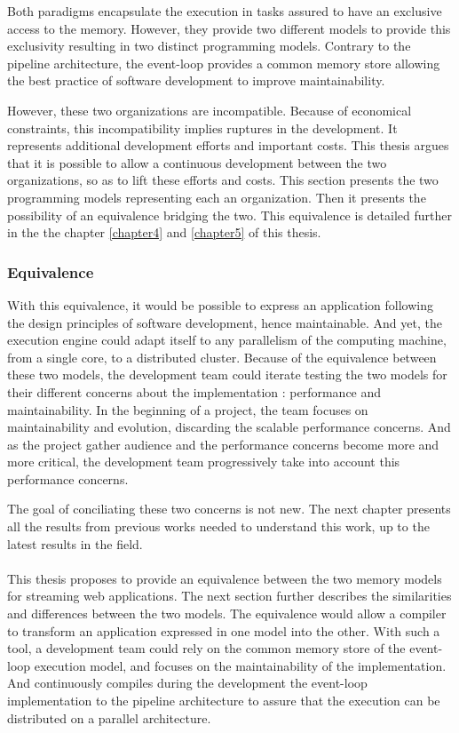 Both paradigms encapsulate the execution in tasks assured to have an exclusive access to the memory.
However, they provide two different models to provide this exclusivity resulting in two distinct programming models.
Contrary to the pipeline architecture, the event-loop provides a common memory store allowing the best practice of software development to improve maintainability.

However, these two organizations are incompatible.
Because of economical constraints, this incompatibility implies ruptures in the development.
It represents additional development efforts and important costs.
This thesis argues that it is possible to allow a continuous development between the two organizations, so as to lift these efforts and costs.
This section presents the two programming models representing each an organization.
Then it presents the possibility of an equivalence bridging the two.
This equivalence is detailed further in the the chapter \ref{chapter4} and \ref{chapter5} of this thesis.

\subsubsection{Equivalence}

With this equivalence, it would be possible to express an application following the design principles of software development, hence maintainable.
And yet, the execution engine could adapt itself to any parallelism of the computing machine, from a single core, to a distributed cluster.
Because of the equivalence between these two models, the development team could iterate testing the two models for their different concerns about the implementation : performance and maintainability.
In the beginning of a project, the team focuses on maintainability and evolution, discarding the scalable performance concerns.
And as the project gather audience and the performance concerns become more and more critical, the development team progressively take into account this performance concerns.

The goal of conciliating these two concerns is not new.
The next chapter presents all the results from previous works needed to understand this work, up to the latest results in the field.

\paragraph{}

This thesis proposes to provide an equivalence between the two memory models for streaming web applications.
The next section further describes the similarities and differences between the two models.
The equivalence would allow a compiler to transform an application expressed in one model into the other.
With such a tool, a development team could rely on the common memory store of the event-loop execution model, and focuses on the maintainability of the implementation.
And continuously compiles during the development the event-loop implementation to the pipeline architecture to assure that the execution can be distributed on a parallel architecture.